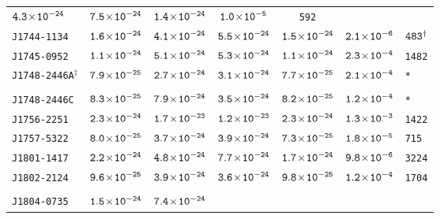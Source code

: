 \begin{longtable}{ l | c | c | c | c | c | l }
\scriptsize{$\tt{4.3\!\times\!10^{-24}}$} &
\scriptsize{$\tt{7.5\!\times\!10^{-24}}$} &\scriptsize{$\tt{1.4\!\times\!10^{-24}}$} & \scriptsize{$\tt{1.0\!\times\!10^{-5}}$} &
\scriptsize{\tt{592}} \\[-16pt] 
\scriptsize{\tt{J1744-1134}} & \scriptsize{$\tt{1.6\!\times\!10^{-24}}$} & \scriptsize{$\tt{4.1\!\times\!10^{-24}}$} &
\scriptsize{$\tt{5.5\!\times\!10^{-24}}$} & \scriptsize{$\tt{1.5\!\times\!10^{-24}}$} & \scriptsize{$\tt{2.1\!\times\!10^{-6}}$} &
\scriptsize{$\tt{483^{\dagger}}$} \\[-16pt] 
\scriptsize{\tt{J1745-0952}} & \scriptsize{$\tt{1.1\!\times\!10^{-24}}$} & \scriptsize{$\tt{5.1\!\times\!10^{-24}}$} &
\scriptsize{$\tt{5.3\!\times\!10^{-24}}$} &\scriptsize{$\tt{1.1\!\times\!10^{-24}}$} & \scriptsize{$\tt{2.3\!\times\!10^{-4}}$} &
\scriptsize{\tt{1482}} \\[-16pt] 
\scriptsize{\tt{J1748-2446A}$^{\ddagger}$} & \scriptsize{$\tt{7.9\!\times\!10^{-25}}$} &
\scriptsize{$\tt{2.7\!\times\!10^{-24}}$} & \scriptsize{$\tt{3.1\!\times\!10^{-24}}$} & \scriptsize{$\tt{7.7\!\times\!10^{-25}}$}
& \scriptsize{$\tt{2.1\!\times\!10^{-4}}$} & \scriptsize{\tt{*}} \\[-16pt] 
\\[-20pt] 
\scriptsize{\tt{J1748-2446C}} & \scriptsize{$\tt{8.3\!\times\!10^{-25}}$} & \scriptsize{$\tt{7.9\!\times\!10^{-24}}$} &
\scriptsize{$\tt{3.5\!\times\!10^{-24}}$} & \scriptsize{$\tt{8.2\!\times\!10^{-25}}$} & \scriptsize{$\tt{1.2\!\times\!10^{-4}}$} &
\scriptsize{\tt{*}} \\[-16pt] 
\scriptsize{\tt{J1756-2251}} & \scriptsize{$\tt{2.3\!\times\!10^{-24}}$} & \scriptsize{$\tt{1.7\!\times\!10^{-23}}$} &
\scriptsize{$\tt{1.2\!\times\!10^{-23}}$} &\scriptsize{$\tt{2.3\!\times\!10^{-24}}$} & \scriptsize{$\tt{1.3\!\times\!10^{-3}}$} &
\scriptsize{\tt{1422}} \\[-16pt] 
\scriptsize{\tt{J1757-5322}} & \scriptsize{$\tt{8.0\!\times\!10^{-25}}$} & \scriptsize{$\tt{3.7\!\times\!10^{-24}}$} &
\scriptsize{$\tt{3.9\!\times\!10^{-24}}$} &\scriptsize{$\tt{7.3\!\times\!10^{-25}}$} & \scriptsize{$\tt{1.8\!\times\!10^{-5}}$} &
\scriptsize{\tt{715}} \\[-16pt] 
\scriptsize{\tt{J1801-1417}} & \scriptsize{$\tt{2.2\!\times\!10^{-24}}$} & \scriptsize{$\tt{4.8\!\times\!10^{-24}}$} &
\scriptsize{$\tt{7.7\!\times\!10^{-24}}$} &\scriptsize{$\tt{1.7\!\times\!10^{-24}}$} & \scriptsize{$\tt{9.8\!\times\!10^{-6}}$} &
\scriptsize{\tt{3224}} \\[-16pt] 
\scriptsize{\tt{J1802-2124}} & \scriptsize{$\tt{9.6\!\times\!10^{-25}}$} & \scriptsize{$\tt{3.9\!\times\!10^{-24}}$} &
\scriptsize{$\tt{3.6\!\times\!10^{-24}}$} &\scriptsize{$\tt{9.8\!\times\!10^{-25}}$} & \scriptsize{$\tt{1.2\!\times\!10^{-4}}$} &
\scriptsize{\tt{1704}} \\[-16pt] 
\\[-20pt] 
\scriptsize{\tt{J1804-0735}} & \scriptsize{$\tt{1.5\!\times\!10^{-24}}$} & \scriptsize{$\tt{7.4\!\times\!10^{-24}}$} &

\end{longtable}
